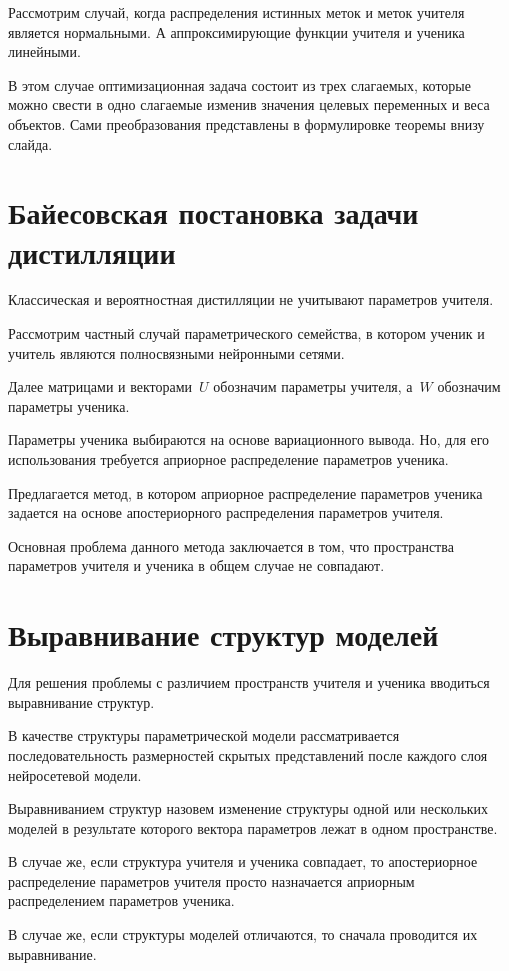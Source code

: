 \documentclass[10pt, twoside]{article}
\begin{document}
Рассмотрим случай, когда распределения истинных меток и меток учителя является нормальными. А аппроксимирующие функции учителя и ученика линейными.

В этом случае оптимизационная задача состоит из трех слагаемых, которые можно свести в одно слагаемые изменив значения целевых переменных и веса объектов. Сами преобразования представлены в формулировке теоремы внизу слайда.

\section{Байесовская постановка задачи дистилляции}
Классическая и вероятностная дистилляции не учитывают параметров учителя.

Рассмотрим частный случай параметрического семейства, в котором ученик и учитель являются полносвязными нейронными сетями.

Далее матрицами и векторами~$U$ обозначим параметры учителя, а~$W$ обозначим параметры ученика.

Параметры ученика выбираются на основе вариационного вывода. Но, для его использования требуется априорное распределение параметров ученика.

Предлагается метод, в котором априорное распределение параметров ученика задается на основе апостериорного распределения параметров учителя.

Основная проблема данного метода заключается в том, что пространства параметров учителя и ученика в общем случае не совпадают.

\section{Выравнивание структур моделей}
Для решения проблемы с различием пространств учителя и ученика вводиться выравнивание структур.

В качестве структуры параметрической модели рассматривается последовательность размерностей скрытых представлений после каждого слоя нейросетевой модели.

Выравниванием структур назовем изменение структуры одной или нескольких моделей в результате которого вектора параметров лежат в одном пространстве.

В случае же, если структура учителя и ученика совпадает, то апостериорное распределение параметров учителя просто назначается априорным распределением параметров ученика.

В случае же, если структуры моделей отличаются, то сначала проводится их выравнивание.
\end{document}
